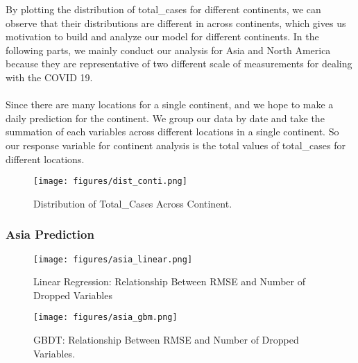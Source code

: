 \documentclass{article}
\begin{document}
By plotting the distribution of total\_cases for different continents, we can observe that their distributions are different in across continents, which gives us motivation to build and analyze our model for different continents. In the following parts, we mainly conduct our analysis for Asia and North America because they are representative of two different scale of measurements for dealing with the COVID 19. \\
\\
Since there are many locations for a single continent, and we hope to make a daily prediction for the continent. We group our data by date and take the summation of each variables across different locations in a single continent. So our response variable for continent analysis is the total values of total\_cases for different locations.

\begin{figure}[H]
    \centering
    \texttt{[image: figures/dist\_conti.png]}%
    \caption{Distribution of Total\_Cases Across Continent.}
    \label{fig:heatmap}
\end{figure}

\subsubsection{Asia Prediction}

\begin{figure}[H]
    \centering
    \texttt{[image: figures/asia\_linear.png]}%
    \caption{Linear Regression: Relationship Between RMSE and Number of Dropped Variables}
    \label{fig:heatmap}
\end{figure}


\begin{figure}[H]
    \centering
    \texttt{[image: figures/asia\_gbm.png]}%
    \caption{GBDT: Relationship Between RMSE and Number of Dropped Variables.}
    \label{fig:heatmap}
\end{figure}
\end{document}
